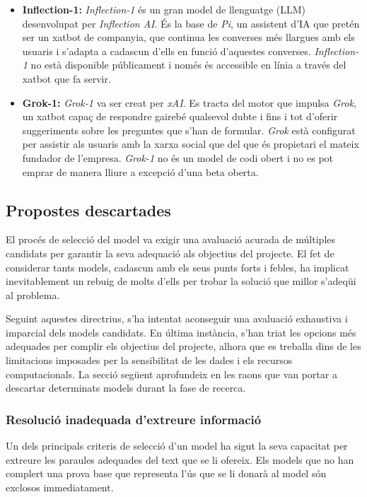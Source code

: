 \begin{itemize}
  \item \textbf{Inflection-1:} \textit{Inflection-1} és un gran model de llenguatge (LLM) desenvolupat per \textit{Inflection AI}. És la base de \textit{Pi}, un assistent d'IA que pretén ser un xatbot de companyia, que continua les converses més llargues amb els usuaris i s'adapta a cadascun d'ells en funció d'aquestes converses. \textit{Inflection-1} no està disponible públicament i només és accessible en línia a través del xatbot que fa servir.
  \item \textbf{Grok-1:} \textit{Grok-1} va ser creat per \textit{xAI}. Es tracta del motor que impulsa \textit{Grok}, un xatbot capaç de respondre gairebé qualsevol dubte i fins i tot d'oferir suggeriments sobre les preguntes que s'han de formular. \textit{Grok} està configurat per assistir als usuaris amb la xarxa social que del que és propietari el mateix fundador de l'empresa. \textit{Grok-1} no és un model de codi obert i no es pot emprar de manera lliure a excepció d'una beta oberta.
\end{itemize}

\subsection{Propostes descartades}
El procés de selecció del model va exigir una avaluació acurada de múltiples candidats per garantir la seva adequació als objectius del projecte. El fet de considerar tants models, cadascun amb els seus punts forts i febles, ha implicat inevitablement un rebuig de molts d'ells per trobar la solució que millor s'adeqüi al problema. 

Seguint aquestes directrius, s'ha intentat aconseguir una avaluació exhaustiva i imparcial dels models candidats. En última instància, s'han triat les opcions més adequades per complir els objectius del projecte, alhora que es treballa dins de les limitacions imposades per la sensibilitat de les dades i els recursos computacionals. La secció següent aprofundeix en les raons que van portar a descartar determinats models durant la fase de recerca.

\subsubsection{Resolució inadequada d'extreure informació}
Un dels principals criteris de selecció d'un model ha sigut la seva capacitat per extreure les paraules adequades del text que se li ofereix. Els models que no han complert una prova base que representa l'ús que se li donarà al model són exclosos immediatament. 

